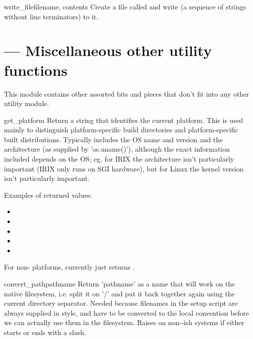 \documentclass{manual}
\begin{document}
\begin{funcdesc}{write_file}{filename, contents}
Create a file called  and write  (a
sequence of strings without line terminators) to it.
\end{funcdesc}

\section{ --- Miscellaneous other utility functions}

This module contains other assorted bits and pieces that don't fit into 
any other utility module.

\begin{funcdesc}{get_platform}{}
Return a string that identifies the current platform.  This is used
mainly to distinguish platform-specific build directories and
platform-specific built distributions.  Typically includes the OS name
and version and the architecture (as supplied by 'os.uname()'),
although the exact information included depends on the OS; eg. for IRIX
the architecture isn't particularly important (IRIX only runs on SGI
hardware), but for Linux the kernel version isn't particularly
important.

Examples of returned values:
\begin{itemize}
\item {}
\item {}
\item {}
\item {}
\item {}
\end{itemize}

For non-\POSIX{} platforms, currently just returns .
\end{funcdesc}

\begin{funcdesc}{convert_path}{pathname}
Return 'pathname' as a name that will work on the native filesystem,
i.e. split it on '/' and put it back together again using the current
directory separator.  Needed because filenames in the setup script are
always supplied in \UNIX{} style, and have to be converted to the local
convention before we can actually use them in the filesystem.  Raises
 on non-\UNIX-ish systems if  either 
starts or ends with a slash.
\end{funcdesc}
\end{document}
